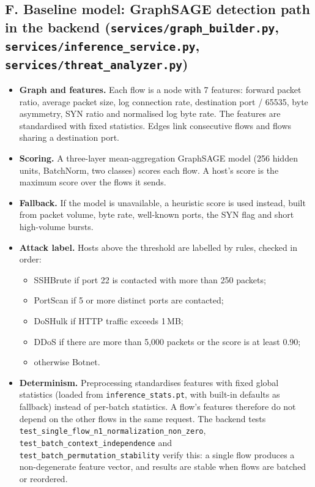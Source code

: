 \documentclass[12pt,a4paper]{report}
\begin{document}
\subsection*{F. Baseline model: GraphSAGE detection path in the backend (\texttt{services/graph\_builder.py}, \texttt{services/inference\_service.py}, \texttt{services/threat\_analyzer.py})}
\begin{itemize}
    \item \textbf{Graph and features.} Each flow is a node with 7 features: forward packet ratio, average packet size, log connection rate, destination port / 65535, byte asymmetry, SYN ratio and normalised log byte rate. The features are standardised with fixed statistics. Edges link consecutive flows and flows sharing a destination port.
    \item \textbf{Scoring.} A three-layer mean-aggregation GraphSAGE model (256 hidden units, BatchNorm, two classes) scores each flow. A host's score is the maximum score over the flows it sends.
    \item \textbf{Fallback.} If the model is unavailable, a heuristic score is used instead, built from packet volume, byte rate, well-known ports, the SYN flag and short high-volume bursts.
    \item \textbf{Attack label.} Hosts above the threshold are labelled by rules, checked in order:
    \begin{itemize}
        \item SSHBrute if port 22 is contacted with more than 250 packets;
        \item PortScan if 5 or more distinct ports are contacted;
        \item DoSHulk if HTTP traffic exceeds 1\,MB;
        \item DDoS if there are more than 5{,}000 packets or the score is at least 0.90;
        \item otherwise Botnet.
    \end{itemize}
    \item \textbf{Determinism.} Preprocessing standardises features with fixed global statistics (loaded from \texttt{inference\_\allowbreak{}stats.pt}, with built-in defaults as fallback) instead of per-batch statistics. A flow's features therefore do not depend on the other flows in the same request. The backend tests \texttt{test\_\allowbreak{}single\_\allowbreak{}flow\_\allowbreak{}n1\_\allowbreak{}normalization\_\allowbreak{}non\_\allowbreak{}zero}, \texttt{test\_\allowbreak{}batch\_\allowbreak{}context\_\allowbreak{}independence} and \texttt{test\_\allowbreak{}batch\_\allowbreak{}permutation\_\allowbreak{}stability} verify this: a single flow produces a non-degenerate feature vector, and results are stable when flows are batched or reordered.
\end{itemize}
\end{document}
